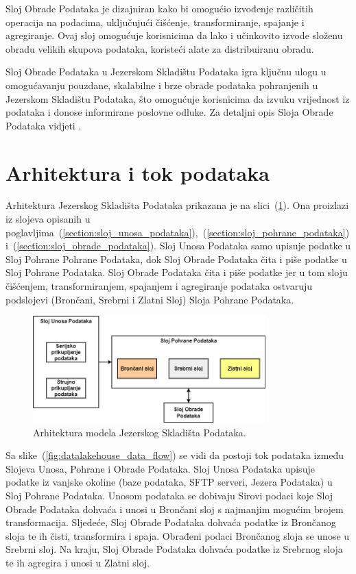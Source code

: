 Sloj Obrade Podataka je dizajniran kako bi omogućio izvođenje različitih
operacija na podacima, uključujući čišćenje, transformiranje, spajanje i
agregiranje. Ovaj sloj omogućuje korisnicima da lako i učinkovito izvode složenu
obradu velikih skupova podataka, koristeći alate za distribuiranu obradu.

Sloj Obrade Podataka u Jezerskom Skladištu Podataka igra ključnu ulogu u
omogućavanju pouzdane, skalabilne i brze obrade podataka pohranjenih u Jezerskom
Skladištu Podataka, što omogućuje korisnicima da izvuku vrijednost iz podataka i
donose informirane poslovne odluke. Za detaljni opis Sloja Obrade Podataka
vidjeti \cite{datalakehouse2022}.

\section{Arhitektura i tok podataka} \label{section:arhitektura_i_tok_podataka}

Arhitektura Jezerskog Skladišta Podataka prikazana je na
slici~(\ref{fig:datalakehouse_architecture}). Ona proizlazi iz slojeva opisanih
u
poglavljima~(\ref{section:sloj_unosa_podataka}),~(\ref{section:sloj_pohrane_podataka})
i~(\ref{section:sloj_obrade_podataka}). Sloj Unosa Podataka samo upisuje podatke
u Sloj Pohrane Pohrane Podataka, dok Sloj Obrade Podataka čita i piše podatke u
Sloj Pohrane Podataka. Sloj Obrade Podataka čita i piše podatke jer u tom sloju
čišćenjem, transformiranjem, spajanjem i agregiranje podataka ostvaruju
podslojevi (Brončani, Srebrni i Zlatni Sloj) Sloja Pohrane Podataka.

\begin{figure}[htb]
    \centering
    \includegraphics[width=0.8\textwidth]{images/arhitektura.drawio.png}
    \caption{Arhitektura modela Jezerskog Skladišta Podataka.}
    \label{fig:datalakehouse_architecture}
\end{figure}

Sa slike~(\ref{fig:datalakehouse_data_flow}) se vidi da postoji tok podataka
između Slojeva Unosa, Pohrane i Obrade Podataka. Sloj Unosa Podataka upisuje
podatke iz vanjske okoline (baze podataka, SFTP serveri, Jezera Podataka) u Sloj
Pohrane Podataka. Unosom podataka se dobivaju Sirovi podaci koje Sloj Obrade
Podataka dohvaća i unosi u Brončani sloj s najmanjim mogućim brojem
transformacija. Sljedeće, Sloj Obrade Podataka dohvaća podatke iz Brončanog
sloja te ih čisti, transformira i spaja. Obrađeni podaci Brončanog sloja se
unose u Srebrni sloj. Na kraju, Sloj Obrade Podataka dohvaća podatke iz Srebrnog
sloja te ih agregira i unosi u Zlatni sloj. 

